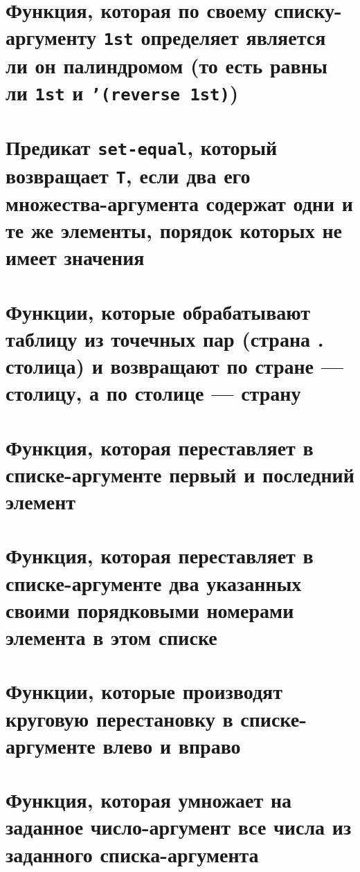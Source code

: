 
\section{Функция, которая по своему списку-аргументу \texttt{1st} определяет является ли он палиндромом (то есть равны ли \texttt{1st} и \texttt{'(reverse 1st)})}



\section{Предикат \texttt{set-equal}, который возвращает \texttt{T}, если два его множества-аргу\-мента содержат одни и те же элементы, порядок которых не имеет значения}




\section{Функции, которые обрабатывают таблицу из точечных пар (страна . столица) и возвращают по стране --- столицу, а по столице --- страну}



\section{Функция, которая переставляет в списке-аргументе первый и последний элемент}



\section{Функция, которая переставляет в списке-аргументе два указанных своими порядковыми номерами элемента в этом списке}



\section{Функции, которые производят круговую перестановку в списке-аргументе влево и вправо}



\section{Функция, которая умножает на заданное число-аргумент все числа из заданного списка-аргумента}


